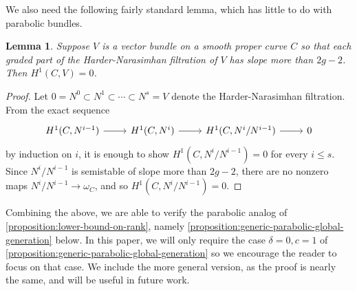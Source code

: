 \documentclass[12 pt]{amsart}
\theoremstyle{plain}
\newtheorem{lemma}[subsubsection]{Lemma}
\theoremstyle{definition}
\theoremstyle{remark}
\numberwithin{equation}{section}
\begin{document}
We also need the following fairly standard lemma, which has little to do with
parabolic bundles.
\begin{lemma}
	\label{lemma:cohomology-vanish-for-large-slope}
	Suppose $V$ is a vector bundle on a smooth proper curve $C$ so that each
	graded part of the Harder-Narasimhan filtration of $V$ has slope more
	than $2g - 2$. Then $H^1(C, V) = 0$.
\end{lemma}
\begin{proof}
	Let $0= N^0 \subset N^1 \subset \cdots \subset N^s = V$ denote the
	Harder-Narasimhan filtration.
	From the exact sequence
	\begin{equation}
		\label{equation:}
		\begin{tikzcd}
			H^1(C, N^{i-1}) \ar {r} & H^1(C, N^i) \ar {r} & H^1(C,
			N^i/N^{i-1}) \ar {r} & 0 
	\end{tikzcd}\end{equation}
	by induction on $i$, it is enough to show $H^1(C, N^i/N^{i-1}) = 0$ for
	every $i \leq s$.
	Since $N^i/N^{i-1}$ is semistable of slope more than $2g-2$, there are
	no nonzero maps $N^i/N^{i-1} \to \omega_C$, and so 
	$H^1(C, N^i/N^{i-1}) = 0$.
\end{proof}

Combining the above, we are able to verify the parabolic analog of
\autoref{proposition:lower-bound-on-rank}, namely \autoref{proposition:generic-parabolic-global-generation} below.
In this paper, we will only require the case $\delta = 0, c = 1$
of \autoref{proposition:generic-parabolic-global-generation}
so we encourage the reader to focus on that case.
We include the more general version, as the proof is nearly the same, 
and will be useful in future work.
\end{document}
